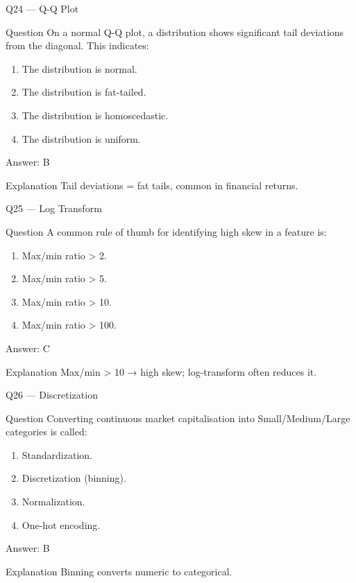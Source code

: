 \documentclass[aspectratio=169,8pt]{beamer}
\begin{document}
	\begin{frame}{Q24 --- Q-Q Plot}
		\begin{block}{Question}
			On a normal Q-Q plot, a distribution shows significant tail deviations from the diagonal. This indicates:
		\end{block}
		\begin{enumerate}
			\item The distribution is normal.
			\item The distribution is fat-tailed.
			\item The distribution is homoscedastic.
			\item The distribution is uniform.
		\end{enumerate}
		\begin{exampleblock}{Answer: B}\end{exampleblock}
		\begin{block}{Explanation}
			Tail deviations = fat tails, common in financial returns.
		\end{block}
	\end{frame}
	
	\begin{frame}{Q25 --- Log Transform}
		\begin{block}{Question}
			A common rule of thumb for identifying high skew in a feature is:
		\end{block}
		\begin{enumerate}
			\item Max/min ratio > 2.
			\item Max/min ratio > 5.
			\item Max/min ratio > 10.
			\item Max/min ratio > 100.
		\end{enumerate}
		\begin{exampleblock}{Answer: C}\end{exampleblock}
		\begin{block}{Explanation}
			Max/min > 10 → high skew; log-transform often reduces it.
		\end{block}
	\end{frame}
	
	\begin{frame}{Q26 --- Discretization}
		\begin{block}{Question}
			Converting continuous market capitalisation into Small/Medium/Large categories is called:
		\end{block}
		\begin{enumerate}
			\item Standardization.
			\item Discretization (binning).
			\item Normalization.
			\item One-hot encoding.
		\end{enumerate}
		\begin{exampleblock}{Answer: B}\end{exampleblock}
		\begin{block}{Explanation}
			Binning converts numeric to categorical.
		\end{block}
	\end{frame}
	
\end{document}
